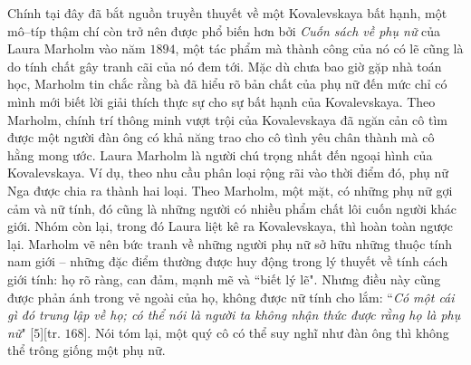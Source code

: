 \begin{multicols}{2}
	Chính tại đây đã bắt nguồn truyền thuyết về một Kovalevskaya bất hạnh, một mô--típ thậm chí còn trở nên được phổ biến hơn bởi \textit{Cuốn sách về phụ nữ} của Laura Marholm vào năm $1894$, một tác phẩm mà thành công của nó có lẽ cũng là do tính chất gây tranh cãi của nó đem tới. Mặc dù chưa bao giờ gặp nhà toán học, Marholm tin chắc rằng bà đã hiểu rõ bản chất của phụ nữ đến mức chỉ có mình mới biết lời giải thích thực sự cho sự bất hạnh của Kovalevskaya. Theo Marholm, chính trí thông minh vượt trội của Kovalevskaya đã ngăn cản cô tìm được một người đàn ông có khả năng trao cho cô tình yêu chân thành mà cô hằng mong ước. Laura Marholm là người chú trọng nhất đến ngoại hình của Kovalevskaya. Ví dụ, theo nhu cầu phân loại rộng rãi vào thời điểm đó, phụ nữ Nga được chia ra thành hai loại. Theo Marholm, một mặt, có những phụ nữ gợi cảm và nữ tính, đó cũng là những người có nhiều phẩm chất lôi cuốn người khác giới. Nhóm còn lại, trong đó Laura liệt kê ra Kovalevskaya, thì hoàn toàn ngược lại. Marholm vẽ nên bức tranh về những người phụ nữ sở hữu những thuộc tính nam giới -- những đặc điểm thường được huy động trong lý thuyết về tính cách giới tính: họ rõ ràng, can đảm, mạnh mẽ và ``biết lý lẽ". Nhưng điều này cũng được phản ánh trong vẻ ngoài của họ, không được nữ tính cho lắm: ``\textit{Có một cái gì đó trung lập về họ; có thể nói là người ta không nhận thức được rằng họ là phụ nữ}" [$5$][tr. $168$]. Nói tóm lại, một quý cô có thể suy nghĩ như đàn ông thì không thể trông giống một phụ nữ.
	\vskip 0.1cm

\end{multicols}
